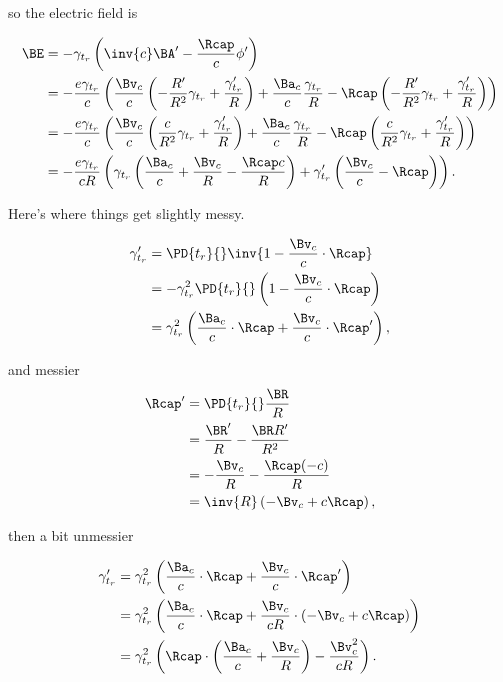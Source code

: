so the electric field is

\begin{align*}
\BE 
&= - \gamma_{t_r} \left( \inv{c} \BA' - \frac{\Rcap}{c} \phi' \right) \\
&= - \frac{e \gamma_{t_r}}{c} \left( 
\frac{\Bv_c}{c} \left( -\frac{R'}{R^2} \gamma_{t_r} + \frac{\gamma_{t_r}'}{R} \right)
+ \frac{\Ba_c}{c} \frac{\gamma_{t_r}}{R}
- \Rcap \left( -\frac{R'}{R^2} \gamma_{t_r} + \frac{\gamma_{t_r}'}{R} \right) 
\right) \\
&= - \frac{e \gamma_{t_r}}{c} \left( 
\frac{\Bv_c}{c} \left( \frac{c}{R^2} \gamma_{t_r} + \frac{\gamma_{t_r}'}{R} \right)
+ \frac{\Ba_c}{c} \frac{\gamma_{t_r}}{R}
- \Rcap \left( \frac{c}{R^2} \gamma_{t_r} + \frac{\gamma_{t_r}'}{R} \right) 
\right) \\
&= - \frac{e \gamma_{t_r}}{c R} \left( \gamma_{t_r} \left( 
\frac{\Ba_c}{c} 
+\frac{\Bv_c}{R} 
- \frac{\Rcap c}{R}
\right)
+ \gamma_{t_r}' \left( \frac{\Bv_c}{c} - \Rcap \right)
\right).
\end{align*}

Here's where things get slightly messy.

\begin{align*}
\gamma_{t_r}' 
&= \PD{t_r}{} \inv{1 - \frac{\Bv_c}{c} \cdot \Rcap } \\
&= -\gamma_{t_r}^2 \PD{t_r}{} \left( 1 - \frac{\Bv_c}{c} \cdot \Rcap \right) \\
&= \gamma_{t_r}^2 \left( \frac{\Ba_c}{c} \cdot \Rcap + \frac{\Bv_c}{c} \cdot \Rcap' \right),
\end{align*}

and messier
\begin{align*}
\Rcap' 
&= \PD{t_r}{} \frac{ \BR }{ R } \\
&= \frac{ \BR' }{ R } - \frac{\BR R'}{R^2} \\
&= -\frac{ \Bv_c }{ R } - \frac{\Rcap (-c)}{R} \\
&= \inv{R} \left( -\Bv_c + c \Rcap \right),
\end{align*}

then a bit unmessier

\begin{align*}
\gamma_{t_r}'
&= \gamma_{t_r}^2 \left( \frac{\Ba_c}{c} \cdot \Rcap + \frac{\Bv_c}{c} \cdot \Rcap' \right) \\
&= \gamma_{t_r}^2 \left( \frac{\Ba_c}{c} \cdot \Rcap + \frac{\Bv_c}{c R} \cdot (-\Bv_c + c \Rcap) \right) \\
&= \gamma_{t_r}^2 \left( \Rcap \cdot \left( \frac{\Ba_c}{c} + \frac{\Bv_c}{R} \right) - \frac{\Bv_c^2}{c R} \right).
\end{align*}

